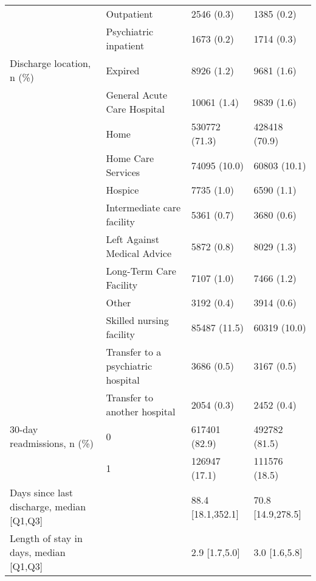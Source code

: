 \begin{tabular}{llll}
                                       & Outpatient &         2546 (0.3) &         1385 (0.2) \\
                                       & Psychiatric inpatient &         1673 (0.2) &         1714 (0.3) \\
Discharge location, n (\%) & Expired &         8926 (1.2) &         9681 (1.6) \\
                                       & General Acute Care Hospital &        10061 (1.4) &         9839 (1.6) \\
                                       & Home &      530772 (71.3) &      428418 (70.9) \\
                                       & Home Care Services &       74095 (10.0) &       60803 (10.1) \\
                                       & Hospice &         7735 (1.0) &         6590 (1.1) \\
                                       & Intermediate care facility &         5361 (0.7) &         3680 (0.6) \\
                                       & Left Against Medical Advice &         5872 (0.8) &         8029 (1.3) \\
                                       & Long-Term Care Facility &         7107 (1.0) &         7466 (1.2) \\
                                       & Other &         3192 (0.4) &         3914 (0.6) \\
                                       & Skilled nursing facility &       85487 (11.5) &       60319 (10.0) \\
                                       & Transfer to a psychiatric hospital &         3686 (0.5) &         3167 (0.5) \\
                                       & Transfer to another hospital &         2054 (0.3) &         2452 (0.4) \\
30-day readmissions, n (\%) & 0 &      617401 (82.9) &      492782 (81.5) \\
                                       & 1 &      126947 (17.1) &      111576 (18.5) \\
Days since last discharge, median [Q1,Q3] &   &  88.4 [18.1,352.1] &  70.8 [14.9,278.5] \\
Length of stay in days, median [Q1,Q3] &   &      2.9 [1.7,5.0] &      3.0 [1.6,5.8] \\
\bottomrule
\end{tabular}
